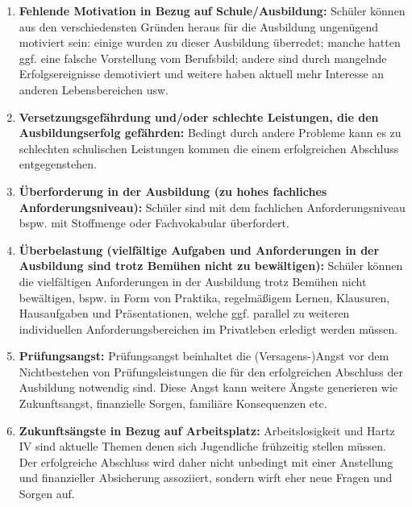 \begin{enumerate}
	\item \textbf{Fehlende Motivation in Bezug auf Schule/Ausbildung:} Schüler können aus den verschiedensten Gründen heraus für die Ausbildung ungenügend motiviert sein: einige wurden zu dieser Ausbildung überredet; manche hatten ggf. eine falsche Vorstellung vom Berufsbild; andere sind durch mangelnde Erfolgsereignisse demotiviert und weitere haben aktuell mehr Interesse an anderen Lebensbereichen usw.
	\item \textbf{Versetzungsgefährdung und/oder schlechte Leistungen, die den Ausbildungserfolg gefährden:} Bedingt durch andere Probleme kann es zu schlechten schulischen Leistungen kommen die einem erfolgreichen Abschluss entgegenstehen. 
	\item \textbf{Überforderung in der Ausbildung (zu hohes fachliches Anforderungsniveau):} Schüler sind mit dem fachlichen Anforderungsniveau bspw. mit Stoffmenge oder Fachvokabular überfordert.
	\item \textbf{Überbelastung (vielfältige Aufgaben und Anforderungen in der Ausbildung sind trotz Bemühen nicht zu bewältigen):} Schüler können die vielfältigen Anforderungen in der Ausbildung trotz Bemühen nicht bewältigen, bspw. in Form von Praktika, regelmäßigem Lernen, Klausuren, Hausaufgaben und Präsentationen, welche ggf. parallel zu weiteren individuellen Anforderungsbereichen im Privatleben erledigt werden müssen.
	\item \textbf{Prüfungsangst:} Prüfungsangst beinhaltet die (Versagens-)Angst vor dem Nichtbestehen von Prüfungsleistungen die für den erfolgreichen Abschluss der Ausbildung notwendig sind. Diese Angst kann weitere Ängste generieren wie Zukunftsangst, finanzielle Sorgen, familiäre Konsequenzen etc.
	\item \textbf{Zukunftsängste in Bezug auf Arbeitsplatz:} Arbeitslosigkeit und Hartz IV sind aktuelle Themen denen sich Jugendliche frühzeitig stellen müssen. Der erfolgreiche Abschluss wird daher nicht unbedingt mit einer Anstellung und finanzieller Absicherung assoziiert, sondern wirft eher neue Fragen und Sorgen auf.
\end{enumerate}

